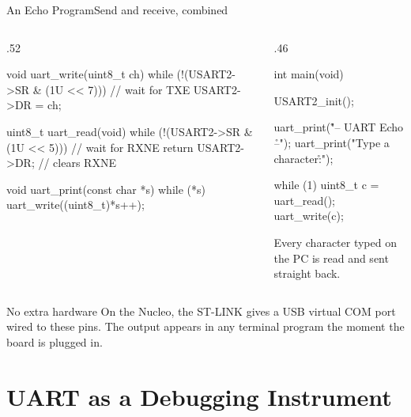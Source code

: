 \documentclass[9pt,aspectratio=169,xcolor=table]{beamer}
\begin{document}
\begin{frame}[fragile]{An Echo Program}{Send and receive, combined}
    \begin{columns}[T]
    \begin{column}{.52\textwidth}
\begin{cc}[basicstyle=\ttfamily\scriptsize]
void uart_write(uint8_t ch) {
    while (!(USART2->SR & (1U << 7))) { }
        // wait for TXE
    USART2->DR = ch;
}

uint8_t uart_read(void) {
    while (!(USART2->SR & (1U << 5))) { }
        // wait for RXNE
    return USART2->DR;   // clears RXNE
}

void uart_print(const char *s) {
    while (*s) uart_write((uint8_t)*s++);
}
\end{cc}
    \end{column}
    \begin{column}{.46\textwidth}
\begin{cc}[basicstyle=\ttfamily\scriptsize]
int main(void) {
    USART2_init();

    uart_print("\r\n-- UART Echo --\r\n");
    uart_print("Type a character:\r\n");

    while (1) {
        uint8_t c = uart_read();
        uart_write(c);
    }
}
\end{cc}
        \vspace{2mm}
        {\small Every character typed on the PC is read and sent straight back.}
    \end{column}
    \end{columns}

    \vspace{2mm}
    \begin{block}{No extra hardware}
        On the Nucleo, the ST-LINK gives a USB \alert{virtual COM port} wired to these pins. The output appears in any terminal program the moment the board is plugged in.
    \end{block}
\end{frame}


\section{UART as a Debugging Instrument}
\end{document}
